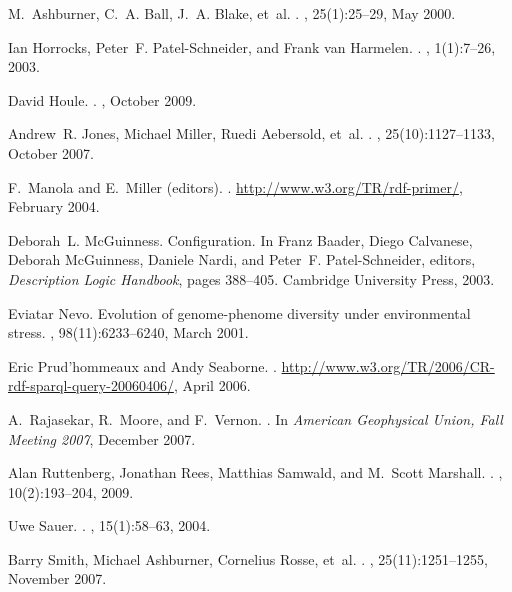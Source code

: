 \documentclass{llncs}
\begin{document}
\newcommand{\gobble}[1]{}
\begin{thebibliography}{10}

M.~Ashburner, C.~A. Ball, J.~A. Blake, et~al.
.
, 25(1):25--29, May 2000.

Ian Horrocks, Peter~F. Patel-Schneider, and Frank van Harmelen.
.
, 1(1):7--26, 2003.

David Houle.
.
, October
  2009.

Andrew~R. Jones, Michael Miller, Ruedi Aebersold, et~al.
.
, 25(10):1127--1133, October 2007.

F.~Manola and E.~Miller (editors).
.
\newblock \url{http://www.w3.org/TR/rdf-primer/}, February 2004.

Deborah~L. McGuinness.
\newblock Configuration.
\newblock In Franz Baader, Diego Calvanese, Deborah McGuinness, Daniele Nardi,
  and Peter~F. Patel-Schneider, editors, {\em Description Logic Handbook},
  pages 388--405. Cambridge University Press, 2003.

Eviatar Nevo.
\newblock Evolution of genome-phenome diversity under environmental stress.
,
  98(11):6233--6240, March 2001.

Eric Prud'hommeaux and Andy Seaborne.
.
\newblock \url{http://www.w3.org/TR/2006/CR-rdf-sparql-query-20060406/}, April
  2006.

A.~Rajasekar, R.~Moore, and F.~Vernon.
.
\newblock In {\em American Geophysical Union, Fall Meeting 2007}, December
  2007.

Alan Ruttenberg, Jonathan Rees, Matthias Samwald, and M.~Scott
Marshall.
.
, 10(2):193--204, 2009.

Uwe Sauer.
.
, 15(1):58--63, 2004.

Barry Smith, Michael Ashburner, Cornelius Rosse, et~al.
.
, 25(11):1251--1255, November 2007.

\end{thebibliography}

\end{document}
